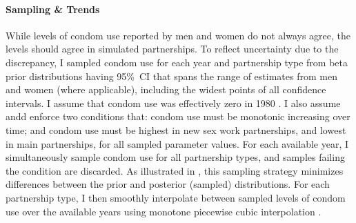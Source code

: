 \paragraph{Sampling \& Trends}
While levels of condom use reported by men and women do not always agree,
the levels should agree in simulated partnerships.
To reflect uncertainty due to the discrepancy,
I sampled condom use for each year and partnership type
from beta prior distributions having 95\%~CI
that spans the range of estimates from men and women (where applicable),
including the widest points of all confidence intervals.
I assume that condom use was effectively zero in 1980 \cite{SFHS1988}.
I also assume andd enforce two conditions that:
condom use must be monotonic increasing over time; and
condom use must be highest in new sex work partnerships, and lowest in main partnerships,
for all sampled parameter values.
For each available year, I simultaneously sample condom use for all partnership types,
and samples failing the condition are discarded.
As illustrated in , this sampling strategy
minimizes differences between the prior and posterior (sampled) distributions.
For each partnership type, I then smoothly interpolate
between sampled levels of condom use over the available years
using monotone piecewise cubic interpolation \cite{Fritsch1980}.
